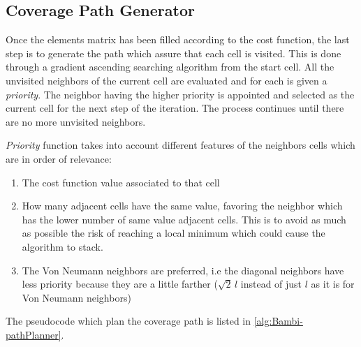 \subsection{Coverage Path Generator} %
\label{sub:coverage_path_generator}
Once the elements matrix has been filled according to the cost function, the last step is to generate the path which assure that each cell is visited. This is done through a gradient ascending searching algorithm from the start cell. All the unvisited neighbors of the current cell are evaluated and for each is given a \textit{priority}. The neighbor having the higher priority is appointed and selected as the current cell for the next step of the iteration. The process continues until there are no more unvisited neighbors.\par
\textit{Priority} function takes into account different features of the neighbors cells which are in order of relevance:
\begin{enumerate}
	\item The cost function value associated to that cell
	\item How many adjacent cells have the same value, favoring the neighbor which has the lower number of same value adjacent cells. This is to avoid as much as possible the risk of reaching a local minimum which could cause the algorithm to stack.
	\item The Von Neumann neighbors are preferred, i.e the diagonal neighbors have less priority because they are a little farther ($\sqrt{2}\,l$ instead of just $l$ as it is for Von Neumann neighbors)
\end{enumerate}
The pseudocode which plan the coverage path is listed in \autoref{alg:Bambi-pathPlanner}.\\
